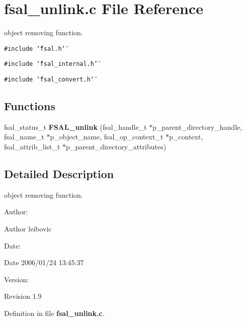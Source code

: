 \section{fsal\_\-unlink.c File Reference}
\label{fsal__unlink_8c}
object removing function. 

{\tt \#include \char`\"{}fsal.h\char`\"{}}\par
{\tt \#include \char`\"{}fsal\_\-internal.h\char`\"{}}\par
{\tt \#include \char`\"{}fsal\_\-convert.h\char`\"{}}\par
\subsection*{Functions}
\begin{CompactItemize}
\item 
fsal\_\-status\_\-t {\bf FSAL\_\-unlink} (fsal\_\-handle\_\-t $\ast$p\_\-parent\_\-directory\_\-handle, fsal\_\-name\_\-t $\ast$p\_\-object\_\-name, fsal\_\-op\_\-context\_\-t $\ast$p\_\-context, fsal\_\-attrib\_\-list\_\-t $\ast$p\_\-parent\_\-directory\_\-attributes)
\end{CompactItemize}


\subsection{Detailed Description}
object removing function. 

\begin{Desc}
\item[Author:]\begin{Desc}
\item[Author]leibovic \end{Desc}
\end{Desc}
\begin{Desc}
\item[Date:]\begin{Desc}
\item[Date]2006/01/24 13:45:37 \end{Desc}
\end{Desc}
\begin{Desc}
\item[Version:]\begin{Desc}
\item[Revision]1.9 \end{Desc}
\end{Desc}


Definition in file {\bf fsal\_\-unlink.c}.


